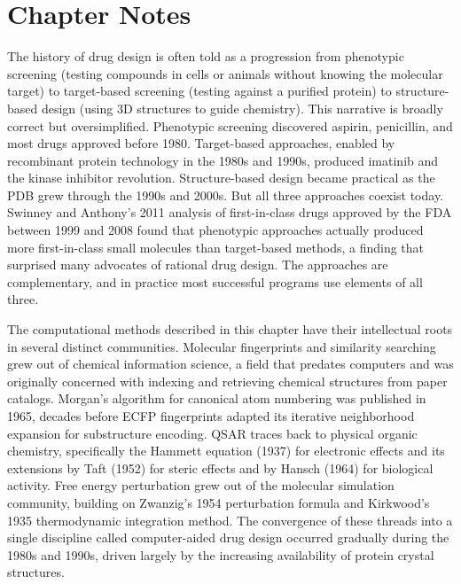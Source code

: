 \section{Chapter Notes}
\label{sec:ch12-notes}

The history of drug design is often told as a progression from phenotypic screening (testing compounds in cells or animals without knowing the molecular target) to target-based screening (testing against a purified protein) to structure-based design (using 3D structures to guide chemistry). This narrative is broadly correct but oversimplified. Phenotypic screening discovered aspirin, penicillin, and most drugs approved before 1980. Target-based approaches, enabled by recombinant protein technology in the 1980s and 1990s, produced imatinib and the kinase inhibitor revolution. Structure-based design became practical as the PDB grew through the 1990s and 2000s. But all three approaches coexist today. Swinney and Anthony's 2011 analysis of first-in-class drugs approved by the FDA between 1999 and 2008 found that phenotypic approaches actually produced more first-in-class small molecules than target-based methods, a finding that surprised many advocates of rational drug design. The approaches are complementary, and in practice most successful programs use elements of all three.

The computational methods described in this chapter have their intellectual roots in several distinct communities. Molecular fingerprints and similarity searching grew out of chemical information science, a field that predates computers and was originally concerned with indexing and retrieving chemical structures from paper catalogs. Morgan's algorithm for canonical atom numbering was published in 1965, decades before ECFP fingerprints adapted its iterative neighborhood expansion for substructure encoding. QSAR traces back to physical organic chemistry, specifically the Hammett equation (1937) for electronic effects and its extensions by Taft (1952) for steric effects and by Hansch (1964) for biological activity. Free energy perturbation grew out of the molecular simulation community, building on Zwanzig's 1954 perturbation formula and Kirkwood's 1935 thermodynamic integration method. The convergence of these threads into a single discipline called computer-aided drug design occurred gradually during the 1980s and 1990s, driven largely by the increasing availability of protein crystal structures.

